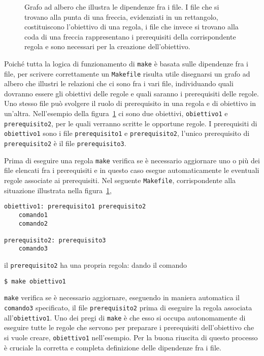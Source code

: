 \begin{figure}
  \centering
  \caption{Grafo ad albero che illustra le dipendenze fra i file.  I file che si
    trovano alla punta di una freccia, evidenziati in un rettangolo,
    costituiscono l'obiettivo di una regola, i file che invece si trovano alla
    coda di una freccia rappresentano i prerequisiti della corrispondente
    regola e sono necessari per la creazione dell'obiettivo.}
  \label{fig:grafo-albero1}
\end{figure}
Poiché tutta la logica di funzionamento di \texttt{make} è basata sulle
dipendenze fra i file, per scrivere correttamente un \texttt{Makefile} risulta
utile disegnarsi un grafo ad albero che illustri le relazioni che ci sono fra i
vari file, individuando quali dovranno essere gli obiettivi delle regole e quali
saranno i prerequisiti delle regole.  Uno stesso file può svolgere il ruolo di
prerequisito in una regola e di obiettivo in un'altra.  Nell'esempio della
figura~\ref{fig:grafo-albero1} ci sono due obiettivi, \texttt{obiettivo1} e
\texttt{prerequisito2}, per le quali verranno scritte le opportune regole.  I
prerequisiti di \texttt{obiettivo1} sono i file \texttt{prerequisito1} e
\texttt{prerequisito2}, l'unico prerequisito di \texttt{prerequisito2} è il file
\texttt{prerequisito3}.

Prima di eseguire una regola \texttt{make} verifica se è necessario aggiornare
uno o più dei file elencati fra i prerequisiti e in questo caso esegue
automaticamente le eventuali regole associate ai prerequisiti.  Nel seguente
\texttt{Makefile}, corrispondente alla situazione illustrata nella
figura~\ref{fig:grafo-albero1},
\begin{lstlisting}
obiettivo1: prerequisito1 prerequisito2
	comando1
	comando2

prerequisito2: prerequisito3
	comando3
\end{lstlisting}
il \texttt{prerequisito2} ha una propria regola: dando il comando
\begin{verbatim}
$ make obiettivo1
\end{verbatim} %
\texttt{make} verifica se è necessario aggiornare, eseguendo in maniera
automatica il \texttt{comando3} specificato, il file \texttt{prerequisito2}
prima di eseguire la regola associata all'\texttt{obiettivo1}.  Uno dei pregi di
\texttt{make} è che esso si occupa autonomamente di eseguire tutte le regole che
servono per preparare i prerequisiti dell'obiettivo che si vuole creare,
\texttt{obiettivo1} nell'esempio.  Per la buona riuscita di questo processo è
cruciale la corretta e completa definizione delle dipendenze fra i file.

